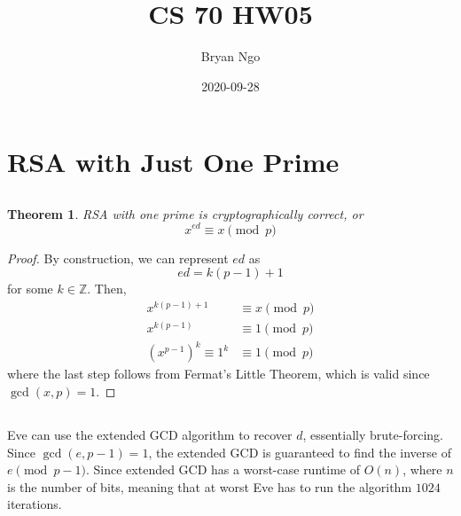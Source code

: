 \documentclass{article}
\title{CS 70 HW05}
\author{Bryan Ngo}
\date{2020-09-28}
\newtheorem{theorem}{Theorem}
\newcommand{\Z}{\mathbb{Z}}
\begin{document}
\maketitle

\section{RSA with Just One Prime}

\subsection{}

\begin{theorem}
    RSA with one prime is cryptographically correct, or
    \begin{equation}
        x^{ed} \equiv x \pmod{p}
    \end{equation}
\end{theorem}
\begin{proof}
    By construction, we can represent \(ed\) as
    \begin{equation}
        ed = k(p - 1) + 1
    \end{equation}
    for some \(k \in \Z\).
    Then,
    \begin{align}
        x^{k(p - 1) + 1} &\equiv x \pmod{p} \\
        x^{k(p - 1)} &\equiv 1 \pmod{p} \\
        (x^{p - 1})^k \equiv 1^k &\equiv 1 \pmod{p}
    \end{align}
    where the last step follows from Fermat's Little Theorem, which is valid since \(\gcd(x, p) = 1\).
\end{proof}

\subsection{}

Eve can use the extended GCD algorithm to recover \(d\), essentially brute-forcing.
Since \(\gcd(e, p - 1) = 1\), the extended GCD is guaranteed to find the inverse of \(e \pmod{p - 1}\).
Since extended GCD has a worst-case runtime of \(O(n)\), where \(n\) is the number of bits, meaning that at worst Eve has to run the algorithm \(1024\) iterations.

\subsection{}
\end{document}
